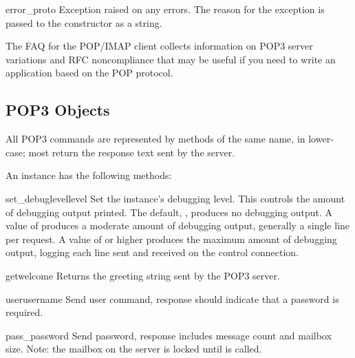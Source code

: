 \begin{excdesc}{error_proto}
Exception raised on any errors.  The reason for the exception is
passed to the constructor as a string.
\end{excdesc}

\begin{seealso}
        {The FAQ for the  POP/IMAP client collects
         information on POP3 server variations and RFC noncompliance
         that may be useful if you need to write an application based
         on the POP protocol.}
\end{seealso}


\subsection{POP3 Objects \label{pop3-objects}}

All POP3 commands are represented by methods of the same name,
in lower-case; most return the response text sent by the server.

An  instance has the following methods:


\begin{methoddesc}{set_debuglevel}{level}
Set the instance's debugging level.  This controls the amount of
debugging output printed.  The default, , produces no
debugging output.  A value of  produces a moderate amount of
debugging output, generally a single line per request.  A value of
 or higher produces the maximum amount of debugging output,
logging each line sent and received on the control connection.
\end{methoddesc}

\begin{methoddesc}{getwelcome}{}
Returns the greeting string sent by the POP3 server.
\end{methoddesc}

\begin{methoddesc}{user}{username}
Send user command, response should indicate that a password is required.
\end{methoddesc}

\begin{methoddesc}{pass_}{password}
Send password, response includes message count and mailbox size.
Note: the mailbox on the server is locked until  is
called.
\end{methoddesc}

